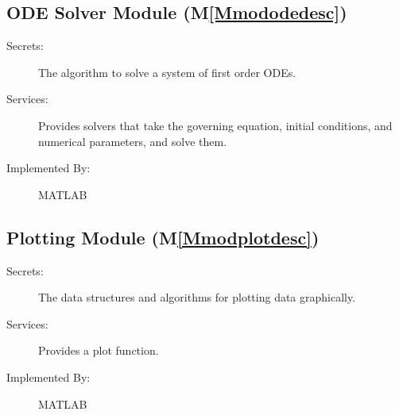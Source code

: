 \documentclass[12pt]{article}
\begin{document}
\subsection{ODE Solver Module (M\ref{Mmododedesc})}
\label{Sec:OSM()}
\begin{description}
\item[Secrets:]The algorithm to solve a system of first order ODEs.
\item[Services:]Provides solvers that take the governing equation, initial conditions, and numerical parameters, and solve them.
\item[Implemented By:]MATLAB
\end{description}
\subsection{Plotting Module (M\ref{Mmodplotdesc})}
\label{Sec:PM()}
\begin{description}
\item[Secrets:]The data structures and algorithms for plotting data graphically.
\item[Services:]Provides a plot function.
\item[Implemented By:]MATLAB
\end{description}
\end{document}
